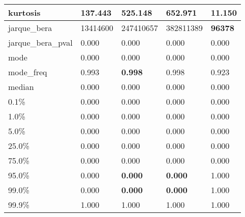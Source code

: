 \begin{table}[H]
\begin{tabular}{|l|m{10em}|m{10em}|m{10em}|m{10em}|}
\hline kurtosis & 137.443 & 525.148 & \cellcolor[rgb]{0.9, 0.54, 0.52} 652.971 & \bfseries 11.150 \\
\hline jarque\_bera & 13414600 & 247410657 & \cellcolor[rgb]{0.9, 0.54, 0.52} 382811389 & \bfseries 96378 \\
\hline jarque\_bera\_pval & 0.000 & 0.000 & 0.000 & 0.000 \\
\hline mode & 0.000 & 0.000 & 0.000 & 0.000 \\
\hline mode\_freq & 0.993 & \bfseries 0.998 & 0.998 & \cellcolor[rgb]{0.9, 0.54, 0.52} 0.923 \\
\hline median & 0.000 & 0.000 & 0.000 & 0.000 \\
\hline 0.1\% & 0.000 & 0.000 & 0.000 & 0.000 \\
\hline 1.0\% & 0.000 & 0.000 & 0.000 & 0.000 \\
\hline 5.0\% & 0.000 & 0.000 & 0.000 & 0.000 \\
\hline 25.0\% & 0.000 & 0.000 & 0.000 & 0.000 \\
\hline 75.0\% & 0.000 & 0.000 & 0.000 & 0.000 \\
\hline 95.0\% & 0.000 & \bfseries 0.000 & \bfseries 0.000 & \cellcolor[rgb]{0.9, 0.54, 0.52} 1.000 \\
\hline 99.0\% & 0.000 & \bfseries 0.000 & \bfseries 0.000 & \cellcolor[rgb]{0.9, 0.54, 0.52} 1.000 \\
\hline 99.9\% & 1.000 & 1.000 & 1.000 & 1.000 \\
\hline
\end{tabular}
\end{table}
